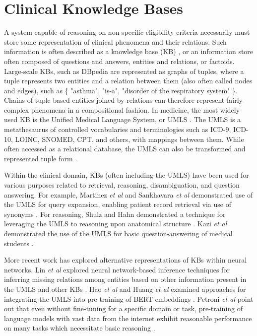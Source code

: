 \documentclass[../main.tex]{subfiles}
\begin{document}
\section{Clinical Knowledge Bases}

A system capable of reasoning on non-specific eligibility criteria necessarily must store some representation of clinical phenomena and their relations. Such information is often described as a knowledge base (KB) \cite{guarino1995ontologies}, or an information store often composed of questions and answers, entities and relations, or factoids. Large-scale KBs, such as DBpedia \cite{lehmann2015dbpedia} are represented as graphs of tuples, where a tuple represents two entities and a relation between them (also often called nodes and edges), such as \{ "asthma", "is-a", "disorder of the respiratory system" \}. Chains of tuple-based entities joined by relations can therefore represent fairly complex phenomena in a compositional fashion. In medicine, the most widely used KB is the Unified Medical Language System, or UMLS \cite{bodenreider2004unified}. The UMLS is a metathesaurus of controlled vocabularies and terminologies such as ICD-9, ICD-10, LOINC, SNOMED, CPT, and others, with mappings between them. While often accessed as a relational database, the UMLS can also be transformed and represented tuple form \cite{noy2009bioportal}. 

Within the clinical domain, KBs (often including the UMLS) have been used for various purposes related to retrieval, reasoning, disambiguation, and question answering. For example, Martinez \textit{et al} and Sankhavara \textit{et al} demonstrated use of the UMLS for query expansion, enabling patient record retrieval via use of synonyms \cite{martinez2014improving, sankhavara2020query}. For reasoning, Shulz and Hahn demonstrated a technique for leveraging the UMLS to reasoning upon anatomical structure \cite{schulz2001medical}. Kazi \textit{et al} demonstrated the use of the UMLS for basic question-answering of medical students \cite{kazi2012medchatbot}. 

More recent work has explored alternative representations of KBs within neural networks. Lin \textit{et al} explored neural network-based inference techniques for inferring missing relations among entities based on other information present in the UMLS and other KBs \cite{lin2018multi}. Hao \textit{et al} and Huang \textit{et al} examined approaches for integrating the UMLS into pre-training of BERT \cite{devlin2018bert} embeddings \cite{hao2020enhancing, huang2020biomedical}. Petroni \textit{et al} point out that even without fine-tuning for a specific domain or task, pre-training of language models with vast data from the internet exhibit reasonable performance on many tasks which necessitate basic reasoning \cite{petroni2019language}.
\end{document}
